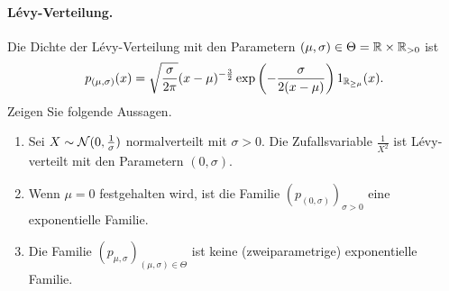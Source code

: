 \paragraph{L\'evy-Verteilung.} Die Dichte der L\'evy-Verteilung mit den
Parametern $(\mu,\sigma)\in \Theta = \mathbb R \times \mathbb R_{>0}$ ist
\begin{equation*}
    p_{(\mu, \sigma)}(x) = \sqrt{ \frac{\sigma}{2\pi}} (x-\mu)^{-\frac{3}{2}} 
    \exp\left( -\frac{\sigma}{2(x-\mu)} \right) 1_{\mathbb R_{\geq \mu}} (x).
\end{equation*}
Zeigen Sie folgende Aussagen.
\begin{enumerate}
    \item Sei $X\sim \mathcal N (0, \frac{1}{\sigma})$ normalverteilt mit $\sigma>0$.
        Die Zufallsvariable $\frac{1}{X^2}$ ist L\'evy-verteilt mit den Parametern
        $(0,\sigma)$.
    \item Wenn $\mu=0$ festgehalten wird, ist die Familie $(p_{(0,\sigma)})_{\sigma>0}$
        eine exponentielle Familie. 
    \item Die Familie $(p_{\mu,\sigma})_{(\mu,\sigma)\in\Theta}$ ist keine
        (zweiparametrige) exponentielle Familie. 
\end{enumerate}

